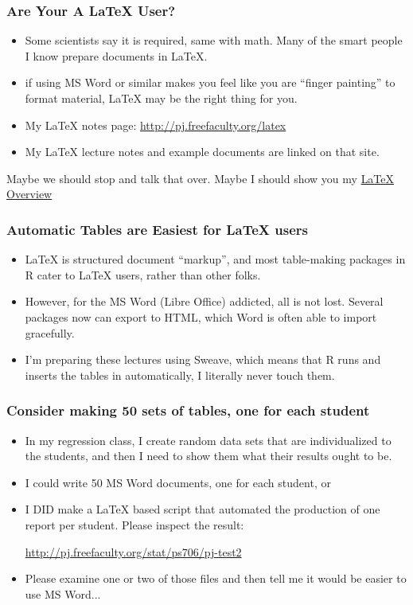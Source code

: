 \documentclass[11pt,english]{beamer}
\begin{document}
\begin{frame}[containsverbatim]
\frametitle{Are Your A LaTeX User?}
\begin{itemize}
\item Some scientists say it is required, same with math. Many of the smart
people I know prepare documents in \LaTeX{}. 
\item if using MS Word or similar makes you feel like you are ``finger
painting'' to format material, \LaTeX{} may be the right thing for
you.
\item My \LaTeX{} notes page: \url{http://pj.freefaculty.org/latex}
\item My \LaTeX{} lecture notes and example documents are linked on that
site. 
\end{itemize}
Maybe we should stop and talk that over. Maybe I should show you my
\href{http://pj.freefaculty.org/guides/Computing-HOWTO/LatexAndLyx/LaTeX-General-1/LaTeX-lecture-1.pdf}{LaTeX Overview}

\end{frame}

\begin{frame}[containsverbatim]
\frametitle{Automatic Tables are Easiest for LaTeX users}
\begin{itemize}
\item \LaTeX{} is structured document ``markup'', and most table-making
packages in R cater to \LaTeX{} users, rather than other folks. 
\item However, for the MS Word (Libre Office) addicted, all is not lost.
Several packages now can export to HTML, which Word is often able
to import gracefully. 
\item I'm preparing these lectures using Sweave, which means that R runs
and inserts the tables in automatically, I literally never touch them.
\end{itemize}
\end{frame}

\begin{frame}
\frametitle{Consider making 50 sets of tables, one for each student}
\begin{itemize}
\item In my regression class, I create random data sets that are individualized
to the students, and then I need to show them what their results ought
to be. 
\item I could write 50 MS Word documents, one for each student, or
\item I DID make a \LaTeX{} based script that automated the production of
one report per student. Please inspect the result:


\url{http://pj.freefaculty.org/stat/ps706/pj-test2}

\item Please examine one or two of those files and then tell me it would
be easier to use MS Word...
\end{itemize}
\end{frame}
\end{document}
